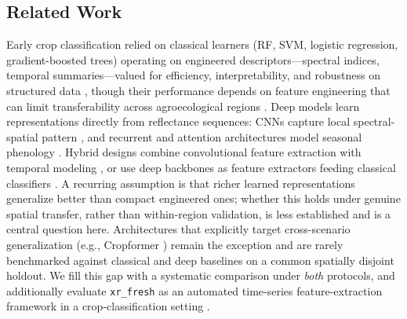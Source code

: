 \documentclass[preprint,authoryear]{elsarticle}
\begin{document}
\subsection{Related Work}
Early crop classification relied on classical learners (RF, SVM, logistic regression, gradient-boosted trees) operating on engineered descriptors---spectral indices, temporal summaries---valued for efficiency, interpretability, and robustness on structured data \citep{maxwell2019, belgiu2016, breiman2001, chen2016, ke2017}, though their performance depends on feature engineering that can limit transferability across agroecological regions \citep{wardlow2007towards, mahlayeye2024}. Deep models learn representations directly from reflectance sequences: CNNs capture local spectral-spatial pattern \citep{cnn_multitemp}, and recurrent and attention architectures model seasonal phenology \citep{ieee2017, russwurm2018, ltae2020, russwurm2020}. Hybrid designs combine convolutional feature extraction with temporal modeling \citep{fan2023hcrnn, tufail2025cnnrnn, bandar2024bilstm}, or use deep backbones as feature extractors feeding classical classifiers \citep{espejo2020, koklu2022, yang2020}. A recurring assumption is that richer learned representations generalize better than compact engineered ones; whether this holds under genuine spatial transfer, rather than within-region validation, is less established and is a central question here. Architectures that explicitly target cross-scenario generalization (e.g., Cropformer \citep{cropformer2023}) remain the exception and are rarely benchmarked against classical and deep baselines on a common spatially disjoint holdout. We fill this gap with a systematic comparison under \emph{both} protocols, and additionally evaluate \texttt{xr\_fresh} as an automated time-series feature-extraction framework in a crop-classification setting \citep{mann2025}.
\end{document}
